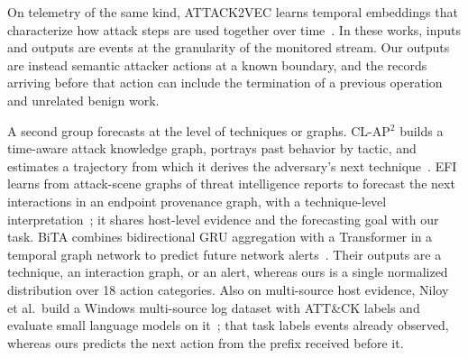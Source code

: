 On telemetry of the same kind, ATTACK2VEC learns temporal embeddings
that characterize how attack steps are used together over
time~\cite{shen2019attack2vec}.
In these works, inputs and outputs are events at the granularity of the
monitored stream. Our outputs are instead semantic attacker actions at a
known boundary, and the records arriving before that action can include
the termination of a previous operation and unrelated benign work.

A second group forecasts at the level of techniques or graphs.
CL-AP$^{2}$ builds a time-aware attack knowledge graph, portrays past
behavior by tactic, and estimates a trajectory from which it derives the
adversary's next technique~\cite{liu2024clap2}.
EFI learns from attack-scene graphs of threat intelligence reports to
forecast the next interactions in an endpoint provenance graph, with a
technique-level interpretation~\cite{zhu2024nip}; it shares host-level
evidence and the forecasting goal with our task.
BiTA combines bidirectional GRU
aggregation with a Transformer in a temporal graph network to predict
future network alerts~\cite{nayeri2026bita}.
Their outputs are a
technique, an interaction graph, or an alert, whereas ours is a single
normalized distribution over 18 action categories. Also on
multi-source host evidence, Niloy et al.\ build a Windows multi-source log dataset with ATT\&CK labels and evaluate small language models on
it~\cite{niloy2026multi}; that task labels events already observed,
whereas ours predicts the next action from the prefix received before
it.

